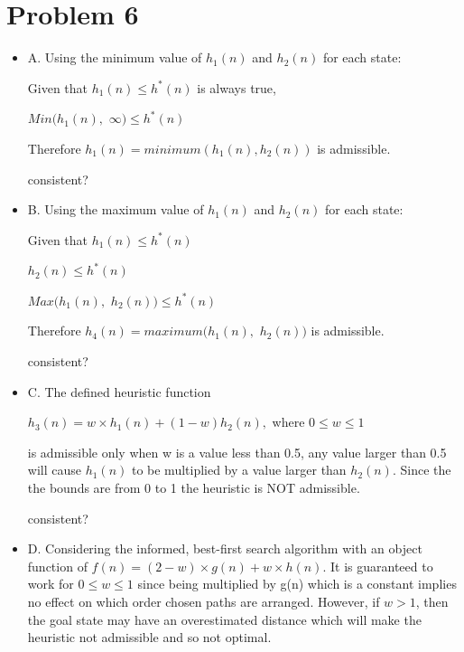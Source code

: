 \documentclass[10pt,a4paper]{article}
\begin{document}
	\section*{Problem 6}
	\begin{itemize}
		\item
		A. Using the minimum value of $h_1(n)$ and $h_2(n)$ for each state:
		
		\begin{center}
			Given that $h_1(n) \leq h^*(n)$ is always true, 
			
			$Min(h_1(n),$ $\infty) \leq h^*(n)$
		
			Therefore $h_1(n) = minimum (h_1(n), h_2(n))$ is admissible. 
			
			consistent? 
		
		\end{center}
		
		\item
		B. Using the maximum value of $h_1(n)$ and $h_2(n)$ for each state:
		
		\begin{center}
			
			Given that $h_1(n) \leq h^*(n)$
			
			$h_2(n) \leq h^*(n)$
			
			$Max(h_1(n),$ $h_2(n)) \leq h^*(n)$
			
			Therefore $h_4(n) = maximum(h_1(n),$ $h_2(n))$ is admissible.
			
			consistent? 
			
		\end{center}
		
		
		\item
		C. The defined heuristic function 
		\begin{center}
			$h_3(n) = w \times h_1(n) + (1-w)h_2(n),$ where $0 \leq w \leq 1$
		\end{center}
		
		is admissible only when w is a value less than 0.5, any value larger than 0.5 will cause $h_1(n)$ to be multiplied by a value larger than $h_2(n)$.  Since the the bounds are from 0 to 1 the heuristic is NOT admissible. 
			
			
			consistent? 
			
		
		
		\item
		D. Considering the informed, best-first search algorithm with an object function of $f(n) = (2-w) \times g(n) + w \times h(n)$. It is guaranteed to work for $0 \leq w \leq 1$ since being multiplied by g(n) which is a constant implies no effect on which order chosen paths are arranged. However, if $w > 1$, then the goal state may have an overestimated distance which will make the heuristic not admissible and so not optimal.
		

\end{itemize}
\end{document}
